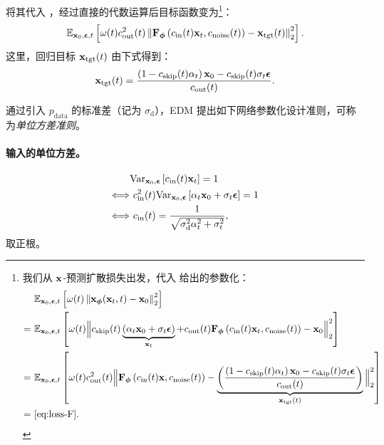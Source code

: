 将其代入 ，经过直接的代数运算后目标函数变为\footnote{我们从 ${\mathbf{x}}$-预测扩散损失出发，代入  给出的参数化：
\begin{align*}
    \begin{aligned}
      &~\mathbb{E}_{\rvx_0, \bm{\epsilon}, t} \left[\omega(t)\norm{ \rvx_{\bm{\phi}}(\rvx_t, t) - \rvx_0}_2^2\right] 
      \\= &~\mathbb{E}_{\rvx_0, \bm{\epsilon}, t} \left[\omega(t)\Big\Vert c_{\mathrm{skip}}(t) \underbrace{(\alpha_t \rvx_0+\sigma_t\beps)}_{\rvx_t} + c_{\mathrm{out}}(t) \rmF_{\bm{\phi}}\left(c_{\mathrm{in}}(t) \rvx_t, c_{\mathrm{noise}}(t)\right) - \rvx_0\Big\Vert_2^2\right]
        \\= &~\mathbb{E}_{\rvx_0, \bm{\epsilon}, t} \left[\omega(t)c_{\mathrm{out}}^2(t)\Big\Vert  \rmF_{\bm{\phi}}\left(c_{\mathrm{in}}(t) \rvx, c_{\mathrm{noise}}(t)\right) - \underbrace{\left(\frac{\left(1-c_{\mathrm{skip}}(t)\alpha_t\right)\rvx_0-c_{\mathrm{skip}}(t)\sigma_t \bm{\epsilon}}{c_{\mathrm{out}}(t)}\right)}_{\rvx_{\mathrm{tgt}}(t)}\Big\Vert_2^2\right]
        \\ = &~\mathrm{\Cref{eq:loss-F}}.
    \end{aligned}
\end{align*}

}：
\begin{align}\label{eq:loss-F}
   \mathbb{E}_{{\mathbf{x}}_0, \bm{\epsilon}, t} \left[\omega(t)c_{\mathrm{out}}^2(t)\left\lVert {\mathbf{F}}_{\bm{\phi}}\left(c_{\mathrm{in}}(t){\mathbf{x}}_t, c_{\mathrm{noise}}(t)\right) - {\mathbf{x}}_{\mathrm{tgt}}(t)\right\rVert_2^2\right].
\end{align}
这里，回归目标 ${\mathbf{x}}_{\mathrm{tgt}}(t)$ 由下式得到：
\[
{\mathbf{x}}_{\mathrm{tgt}}(t) = \frac{\left(1-c_{\mathrm{skip}}(t)\alpha_t\right){\mathbf{x}}_0-c_{\mathrm{skip}}(t)\sigma_t \bm{\epsilon}}{c_{\mathrm{out}}(t)}.
\]

通过引入 $p_{\text{data}}$ 的标准差（记为 $\sigma_{\mathrm{d}}$），EDM 提出如下网络参数化设计准则，可称为\emph{单位方差准则}。

\paragraph{输入的单位方差。}
\begin{align*}
    &\text{Var}_{{\mathbf{x}}_0,\bm{\epsilon}}\left[ c_{\mathrm{in}}(t){\mathbf{x}}_t\right] = 1 \nonumber
    \\ \Longleftrightarrow &~c_{\mathrm{in}}^2(t) \text{Var}_{{\mathbf{x}}_0,\bm{\epsilon}}\left[ \alpha_t {\mathbf{x}}_0 +\sigma_t \bm{\epsilon} \right] = 1 \nonumber
    \\ \Longleftrightarrow &~c_{\mathrm{in}}(t)  = \frac{1}{\sqrt{\sigma_{\mathrm{d}}^2 \alpha_t^2 + \sigma_t^2}},
\end{align*}
取正根。

